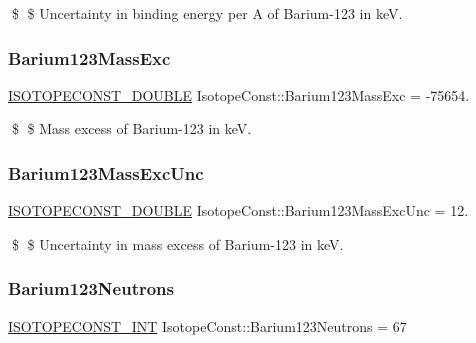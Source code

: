 \$ \$ Uncertainty in binding energy per A of Barium-\/123 in keV. \mbox{\label{group___isotope_const-_barium-_ba123_ga63a7cc06bec4273fb409c4a6e903a99b}} 
\subsubsection{\texorpdfstring{Barium123\+Mass\+Exc}{Barium123MassExc}}
{\footnotesize\ttfamily \mbox{\hyperlink{group___isotope_const-_macros_ga8f45a7272ce02c0b4c65c44636ed719a}{I\+S\+O\+T\+O\+P\+E\+C\+O\+N\+S\+T\+\_\+\+D\+O\+U\+B\+LE}} Isotope\+Const\+::\+Barium123\+Mass\+Exc = -\/75654.}

\$ \$ Mass excess of Barium-\/123 in keV. \mbox{\label{group___isotope_const-_barium-_ba123_gafeefe702a28c158415e2f36e984e4d90}} 
\subsubsection{\texorpdfstring{Barium123\+Mass\+Exc\+Unc}{Barium123MassExcUnc}}
{\footnotesize\ttfamily \mbox{\hyperlink{group___isotope_const-_macros_ga8f45a7272ce02c0b4c65c44636ed719a}{I\+S\+O\+T\+O\+P\+E\+C\+O\+N\+S\+T\+\_\+\+D\+O\+U\+B\+LE}} Isotope\+Const\+::\+Barium123\+Mass\+Exc\+Unc = 12.}

\$ \$ Uncertainty in mass excess of Barium-\/123 in keV. \mbox{\label{group___isotope_const-_barium-_ba123_ga14435cc2003caa169279a4ffc244e4de}} 
\subsubsection{\texorpdfstring{Barium123\+Neutrons}{Barium123Neutrons}}
{\footnotesize\ttfamily \mbox{\hyperlink{group___isotope_const-_macros_ga5f18360b3e99483a35c32d789e62621c}{I\+S\+O\+T\+O\+P\+E\+C\+O\+N\+S\+T\+\_\+\+I\+NT}} Isotope\+Const\+::\+Barium123\+Neutrons = 67}

